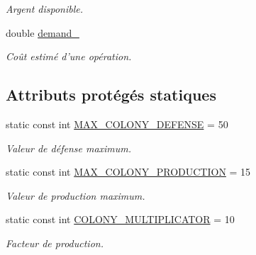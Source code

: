 \begin{DoxyCompactItemize}
\begin{DoxyCompactList}\small\item\em Argent disponible. \end{DoxyCompactList}\item 
\hypertarget{classColonized__planet_af5c7aba0db9f3a8c28d25a309c79ca23}{double \hyperlink{classColonized__planet_af5c7aba0db9f3a8c28d25a309c79ca23}{demand\-\_\-}}\label{classColonized__planet_af5c7aba0db9f3a8c28d25a309c79ca23}

\begin{DoxyCompactList}\small\item\em Coût estimé d'une opération. \end{DoxyCompactList}\end{DoxyCompactItemize}
\subsection*{Attributs protégés statiques}
\begin{DoxyCompactItemize}
\item 
\hypertarget{classColonized__planet_acb5d3542a5441019bcba92197119617c}{static const int \hyperlink{classColonized__planet_acb5d3542a5441019bcba92197119617c}{M\-A\-X\-\_\-\-C\-O\-L\-O\-N\-Y\-\_\-\-D\-E\-F\-E\-N\-S\-E} = 50}\label{classColonized__planet_acb5d3542a5441019bcba92197119617c}

\begin{DoxyCompactList}\small\item\em Valeur de défense maximum. \end{DoxyCompactList}\item 
\hypertarget{classColonized__planet_a8521f4f3a3d0431932cdd2e1988b358f}{static const int \hyperlink{classColonized__planet_a8521f4f3a3d0431932cdd2e1988b358f}{M\-A\-X\-\_\-\-C\-O\-L\-O\-N\-Y\-\_\-\-P\-R\-O\-D\-U\-C\-T\-I\-O\-N} = 15}\label{classColonized__planet_a8521f4f3a3d0431932cdd2e1988b358f}

\begin{DoxyCompactList}\small\item\em Valeur de production maximum. \end{DoxyCompactList}\item 
\hypertarget{classColonized__planet_af44fcc5ced3d38fc514d5daf0abea01d}{static const int \hyperlink{classColonized__planet_af44fcc5ced3d38fc514d5daf0abea01d}{C\-O\-L\-O\-N\-Y\-\_\-\-M\-U\-L\-T\-I\-P\-L\-I\-C\-A\-T\-O\-R} = 10}\label{classColonized__planet_af44fcc5ced3d38fc514d5daf0abea01d}

\begin{DoxyCompactList}\small\item\em Facteur de production. \end{DoxyCompactList}\end{DoxyCompactItemize}
